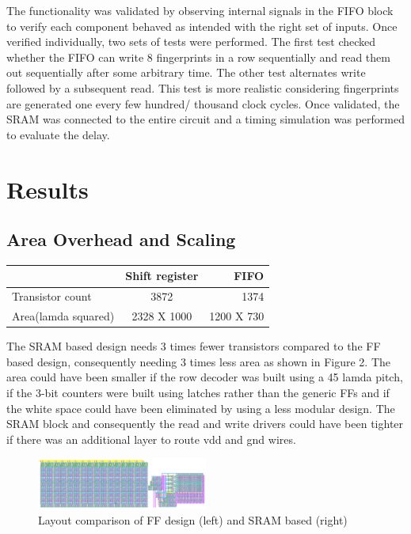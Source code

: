 \documentclass[10pt,journal,compsoc]{IEEEtran}
\begin{document}
The functionality was validated by observing internal signals in the FIFO block to verify each component behaved as intended with the right set of inputs. Once verified individually, two sets of tests were performed. The first test checked whether the FIFO can write 8 fingerprints in a row sequentially and read them out sequentially after some arbitrary time. The other test alternates write followed by a subsequent read. This test is more realistic considering fingerprints are generated one every few hundred/ thousand clock cycles. Once validated, the SRAM was connected to the entire circuit and a timing simulation was performed to evaluate the delay.

\section{Results}


\subsection{Area Overhead and Scaling}


\begin{center}
  \begin{tabular}{ l || c | r }
    \hline
     & Shift register & FIFO  \\ \hline
    Transistor count & 3872 & 1374 \\ \hline
    Area(lamda squared) & 2328 X 1000  & 1200 X 730 \\
    \hline
  \end{tabular}
\end{center}

The SRAM based design needs 3 times fewer transistors compared to the FF based design, consequently needing 3 times less area as shown in Figure 2. The area could have been smaller if the row decoder was built using a 45 lamda pitch, if the 3-bit counters were built using latches rather than the generic FFs and if the white space could have been eliminated by using a less modular design. The SRAM block and consequently the read and write drivers could have been tighter if there was an additional layer to route vdd and gnd wires.	

\begin{figure}[h!]
  \centering

      \includegraphics[width=0.5\textwidth]{layout}
  \caption{Layout comparison of FF design (left) and SRAM based (right)}
\end{figure}
\end{document}
